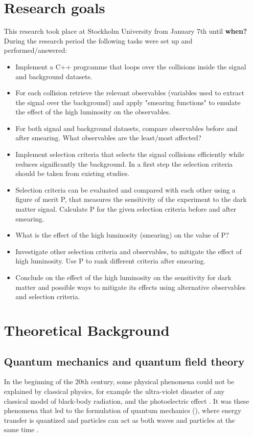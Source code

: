 \section{Research goals}\label{sec:goals}
This research took place at Stockholm University from January 7th until \textbf{when?}
During the research period the following tasks were set up and performed/answered:
\begin{itemize}
\item Implement a C++ programme that loops over the collisions inside the signal and background datasets.	
\item For each collision retrieve the relevant observables (variables used to	 extract the signal over the background) and apply "smearing functions" to emulate the effect of the high luminosity on the observables. 	
\item For both signal and background datasets, compare observables before and after smearing. What observables are the least/most affected?	
\item Implement selection criteria that selects the signal collisions efficiently while reduces significantly the background. In a first step the selection criteria should be taken from existing studies.
\item Selection criteria can be evaluated and compared with each other using a figure of merit P, that measures the sensitivity of the experiment to the	 dark matter signal. Calculate P for the given selection criteria before and after smearing.
\item What is the effect of the high luminosity (smearing) on the value of P?
\item Investigate other selection criteria and observables, to mitigate the effect of high luminosity. Use P to rank different criteria after smearing.
\item Conclude on the effect of the high luminosity on the sensitivity for dark matter and possible ways to mitigate its effects using alternative observables and selection criteria. 
\end{itemize}
\newpage
\section{Theoretical Background}\label{sec:tb}
\subsection{Quantum mechanics and quantum field theory}\label{sec:tb:subsec:qm}
In the beginning of the 20th century, some physical phenomena could not be explained by classical physics, for example the ultra-violet disaster of any classical model of black-body radiation, and the photoelectric effect \citep{Bransden:2000}.
It was these phenomena that led to the formulation of quantum mechanics (\abbrQM), where energy transfer is quantized and particles can act as both waves and particles at the same time \citep{Hallsjo:2013}.

